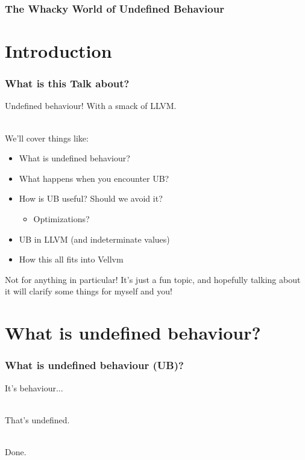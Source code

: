 \documentclass{beamer}
\author{
  Beck, Calvin\\
  \href{mailto:hobbes@seas.upenn.edu}{hobbes@seas.upenn.edu}
}
\begin{document}
\begin{frame}
  \frametitle{The Whacky World of Undefined Behaviour}
  \maketitle
\end{frame}

\section{Introduction}

\begin{frame}
  \frametitle{What is this Talk about?}

  Undefined behaviour! With a smack of LLVM.\\~\

  We'll cover things like:

  \begin{itemize}
  \item What is undefined behaviour?
  \item What happens when you encounter UB?
  \item How is UB useful? Should we avoid it?
    \begin{itemize}
    \item Optimizations?
    \end{itemize}
  \item UB in LLVM (and indeterminate values)
  \item How this all fits into Vellvm
  \end{itemize}
  \vspace{\baselineskip}
  Not for anything in particular! It's just a fun topic, and hopefully
  talking about it will clarify some things for myself and you!

\end{frame}

\section{What is undefined behaviour?}

\begin{frame}[fragile]
  \frametitle{What is undefined behaviour (UB)?}

  It's behaviour...\\~

  \pause

  That's undefined.\\~

  \pause

  \huge{Done.}

\end{frame}
\end{document}
